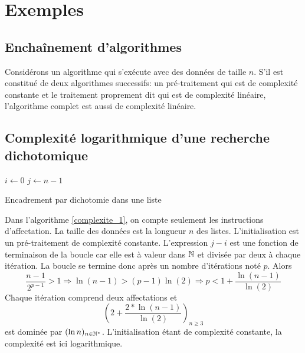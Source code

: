\section{Exemples}
\subsection{Enchaînement d'algorithmes}
Considérons un algorithme qui s'exécute avec des données de taille $n$. S'il est constitué de deux algorithmes successifs: un pré-traitement qui est de complexité constante et le traitement proprement dit qui est de complexité linéaire, l'algorithme complet est aussi de complexité linéaire.

\subsection{Complexité logarithmique d'une recherche dichotomique}
\begin{algorithm}
  $i\leftarrow 0$\;
  $j\leftarrow n-1$\;
  \caption{Encadrement par dichotomie dans une liste}
  \label{complexite_1}
\end{algorithm}
Dans l'algorithme \ref{complexite_1}, on compte seulement les instructions d'affectation. La taille des données est la longueur $n$ des listes.\newline
L'initialisation est un pré-traitement de complexité constante.\newline
L'expression $j-i$ est une fonction de terminaison de la boucle car elle est à valeur dans $\mathbb{N}$ et divisée par deux à chaque itération. La boucle se termine donc après un nombre d'itérations noté $p$. Alors
\begin{displaymath}
  \frac{n-1}{2^{p-1}} > 1
\Rightarrow \ln(n-1) > (p-1) \ln(2)  
\Rightarrow p < 1 + \frac{\ln(n-1)}{\ln(2)}
\end{displaymath}
Chaque itération comprend deux affectations et 
\begin{displaymath}
  \left( 2 + \frac{2*\ln(n-1)}{\ln(2)}\right)_{n\geq 3} 
\end{displaymath}
est dominée par $(\ln n)_{n\in \mathbb{N}^*}$. L'initialisation étant de complexité constante, la complexité est ici logarithmique.

